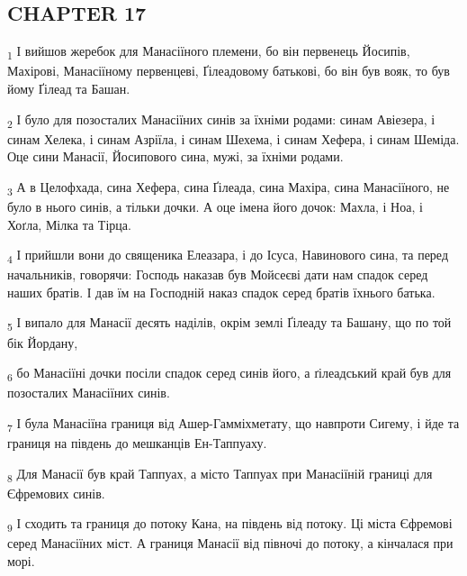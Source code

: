\subsection{CHAPTER 17}
\begin{tcolorbox}
\textsubscript{1} І вийшов жеребок для Манасіїного племени, бо він первенець Йосипів, Махірові, Манасіїному первенцеві, Ґілеадовому батькові, бо він був вояк, то був йому Ґілеад та Башан.
\end{tcolorbox}
\begin{tcolorbox}
\textsubscript{2} І було для позосталих Манасіїних синів за їхніми родами: синам Авіезера, і синам Хелека, і синам Азріїла, і синам Шехема, і синам Хефера, і синам Шеміда. Оце сини Манасії, Йосипового сина, мужі, за їхніми родами.
\end{tcolorbox}
\begin{tcolorbox}
\textsubscript{3} А в Целофхада, сина Хефера, сина Ґілеада, сина Махіра, сина Манасіїного, не було в нього синів, а тільки дочки. А оце імена його дочок: Махла, і Ноа, і Хоґла, Мілка та Тірца.
\end{tcolorbox}
\begin{tcolorbox}
\textsubscript{4} І прийшли вони до священика Елеазара, і до Ісуса, Навинового сина, та перед начальників, говорячи: Господь наказав був Мойсеєві дати нам спадок серед наших братів. І дав їм на Господній наказ спадок серед братів їхнього батька.
\end{tcolorbox}
\begin{tcolorbox}
\textsubscript{5} І випало для Манасії десять наділів, окрім землі Ґілеаду та Башану, що по той бік Йордану,
\end{tcolorbox}
\begin{tcolorbox}
\textsubscript{6} бо Манасіїні дочки посіли спадок серед синів його, а ґілеадський край був для позосталих Манасіїних синів.
\end{tcolorbox}
\begin{tcolorbox}
\textsubscript{7} І була Манасіїна границя від Ашер-Гамміхметату, що навпроти Сигему, і йде та границя на південь до мешканців Ен-Таппуаху.
\end{tcolorbox}
\begin{tcolorbox}
\textsubscript{8} Для Манасії був край Таппуах, а місто Таппуах при Манасіїній границі для Єфремових синів.
\end{tcolorbox}
\begin{tcolorbox}
\textsubscript{9} І сходить та границя до потоку Кана, на південь від потоку. Ці міста Єфремові серед Манасіїних міст. А границя Манасії від півночі до потоку, а кінчалася при морі.
\end{tcolorbox}
